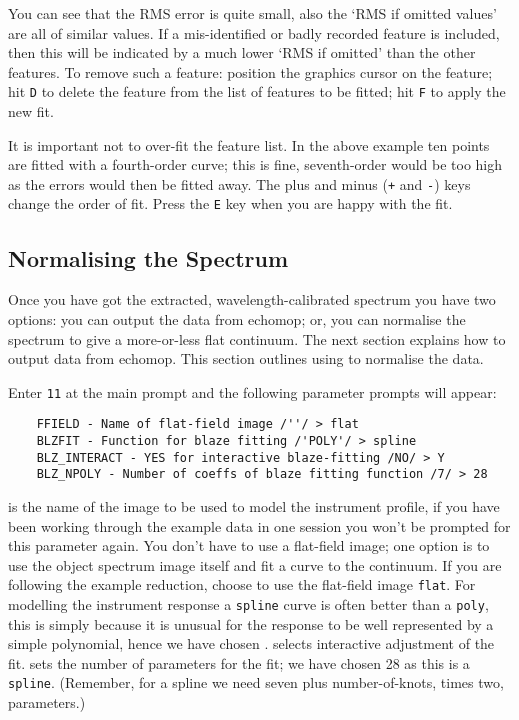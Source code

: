 You can see that the RMS error is quite small, also the `RMS if omitted
values' are all of similar values.  If a mis-identified or badly recorded
feature is included, then this will be indicated by a much lower
`RMS if omitted' than the other features.  To remove such a feature:
position the graphics cursor on the feature; hit \verb+D+ to delete the
feature from the list of features to be fitted; hit \verb+F+ to apply the
new fit.

It is important not to over-fit the feature list.  In the above example
ten points are fitted with a fourth-order curve; this is fine,
seventh-order would be too high as the errors would then be fitted away.
The plus and minus (\verb=+= and \verb=-=) keys change the order of fit.
Press the \verb+E+ key when you are happy with the fit.


\subsection{Normalising the Spectrum}

Once you have got the extracted, wavelength-calibrated spectrum you have
two options: you can output the data from {\sc echomop}; or, you can normalise
the spectrum to give a more-or-less flat continuum.  The next section
explains how to output data from {\sc echomop}.  This section outlines using
 to normalise
the data.

Enter \verb+11+ at the main  prompt
and the following parameter prompts will appear:

{
\scspec{\small}{ }
\begin{verbatim}
    FFIELD - Name of flat-field image /''/ > flat
    BLZFIT - Function for blaze fitting /'POLY'/ > spline
    BLZ_INTERACT - YES for interactive blaze-fitting /NO/ > Y
    BLZ_NPOLY - Number of coeffs of blaze fitting function /7/ > 28
\end{verbatim}
}

 is the name of the image to be
used to model the instrument profile, if you have been working through the
example data in one session you won't be prompted for this parameter
again.
You don't have to use a flat-field image; one option is to use
the object spectrum image itself and fit a curve to the continuum.
If you are following the example reduction, choose to use the flat-field
image \verb+flat+\@.
For modelling the instrument response a \verb+spline+ curve is often
better than a \verb+poly+, this is simply because it is unusual
for the response to be well represented by a simple polynomial, hence we
have chosen \@.
 selects
interactive adjustment of the fit.
 sets the number of
parameters for the fit; we have chosen 28 as this is a \verb+spline+\@.
(Remember, for a spline we need seven plus number-of-knots, times two,
parameters.)

